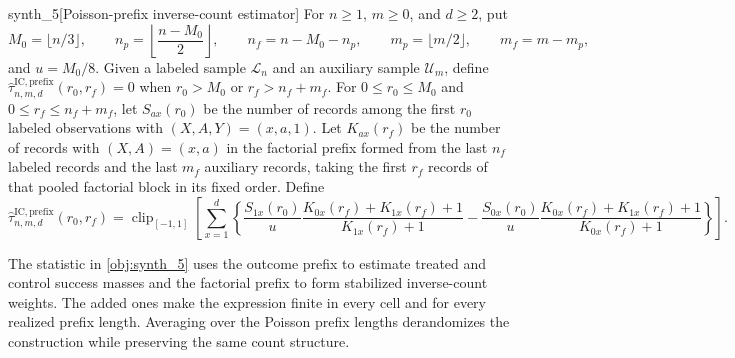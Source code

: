 \begin{definitionv}{synth_5}[Poisson-prefix inverse-count estimator]
For \(n\ge1\), \(m\ge0\), and \(d\ge2\), put
\[
M_0=\lfloor n/3\rfloor,\qquad
n_p=\left\lfloor\frac{n-M_0}{2}\right\rfloor,\qquad
n_f=n-M_0-n_p,\qquad
m_p=\lfloor m/2\rfloor,\qquad
m_f=m-m_p,
\]
and \(u=M_0/8\). Given a labeled sample \(\mathcal L_n\) and an auxiliary sample \(\mathcal U_m\), define \(\widehat\tau^{\mathrm{IC,prefix}}_{n,m,d}(r_0,r_f)=0\) when \(r_0>M_0\) or \(r_f>n_f+m_f\). For \(0\le r_0\le M_0\) and \(0\le r_f\le n_f+m_f\), let \(S_{ax}(r_0)\) be the number of records among the first \(r_0\) labeled observations with \((X,A,Y)=(x,a,1)\). Let \(K_{ax}(r_f)\) be the number of records with \((X,A)=(x,a)\) in the factorial prefix formed from the last \(n_f\) labeled records and the last \(m_f\) auxiliary records, taking the first \(r_f\) records of that pooled factorial block in its fixed order. Define
\[
\widehat\tau^{\mathrm{IC,prefix}}_{n,m,d}(r_0,r_f)
=
\operatorname{clip}_{[-1,1]}
\left[
\sum_{x=1}^d
\left\{
\frac{S_{1x}(r_0)}{u}
\frac{K_{0x}(r_f)+K_{1x}(r_f)+1}{K_{1x}(r_f)+1}
-
\frac{S_{0x}(r_0)}{u}
\frac{K_{0x}(r_f)+K_{1x}(r_f)+1}{K_{0x}(r_f)+1}
\right\}
\right].
\]
\end{definitionv}

The statistic in \cref{obj:synth_5} uses the outcome prefix to estimate treated and control success masses and the factorial prefix to form stabilized inverse-count weights. The added ones make the expression finite in every cell and for every realized prefix length. Averaging over the Poisson prefix lengths derandomizes the construction while preserving the same count structure.

